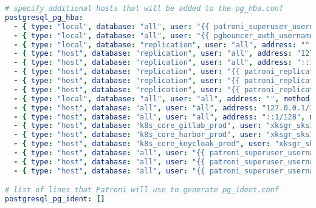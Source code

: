 \begin{flushleft}
\begin{lstlisting}[language=yaml, caption=Testsystem - Deployment - main.yml,captionpos=b,label={lst:testsystem-deployment-main.yml},breaklines=true]
# specify additional hosts that will be added to the pg_hba.conf
postgresql_pg_hba:
  - { type: "local", database: "all", user: "{{ patroni_superuser_username }}", address: "", method: "trust" }
  - { type: "local", database: "all", user: "{{ pgbouncer_auth_username }}", address: "", method: "trust" } # required for pgbouncer auth_user
  - { type: "local", database: "replication", user: "all", address: "", method: "trust" }
  - { type: "host", database: "replication", user: "all", address: "127.0.0.1/32", method: "trust" }
  - { type: "host", database: "replication", user: "all", address: "::1/128", method: "trust" }
  - { type: "host", database: "replication", user: "{{ patroni_replication_username }}", address: "10.0.22.173/24", method: "{{ postgresql_password_encryption_algorithm }}" }
  - { type: "host", database: "replication", user: "{{ patroni_replication_username }}", address: "10.0.22.174/24", method: "{{ postgresql_password_encryption_algorithm }}" }
  - { type: "host", database: "replication", user: "{{ patroni_replication_username }}", address: "10.0.22.175/24", method: "{{ postgresql_password_encryption_algorithm }}" }
  - { type: "local", database: "all", user: "all", address: "", method: "{{ postgresql_password_encryption_algorithm }}" }
  - { type: "host", database: "all", user: "all", address: "127.0.0.1/32", method: "{{ postgresql_password_encryption_algorithm }}" }
  - { type: "host", database: "all", user: "all", address: "::1/128", method: "{{ postgresql_password_encryption_algorithm }}" }
  - { type: "host", database: "k8s_core_gitlab_prod", user: "xksgr_sks1160_gitlab", address: "10.0.20.88/24", method: "{{ postgresql_password_encryption_algorithm }}" }
  - { type: "host", database: "k8s_core_harbor_prod", user: "xksgr_sks1172_harbor", address: "10.0.20.92/24", method: "{{ postgresql_password_encryption_algorithm }}" }
  - { type: "host", database: "k8s_core_keycloak_prod", user: "xksgr_sks1195_kcsso", address: "10.0.20.98/24", method: "{{ postgresql_password_encryption_algorithm }}" }
  - { type: "host", database: "all", user: "{{ patroni_superuser_username }}", address: "10.0.20.63/24", method: "{{ postgresql_password_encryption_algorithm }}" }
  - { type: "host", database: "all", user: "{{ patroni_superuser_username }}", address: "10.0.20.43/24", method: "{{ postgresql_password_encryption_algorithm }}" }
  - { type: "host", database: "all", user: "{{ patroni_superuser_username }}", address: "10.0.20.77/24", method: "{{ postgresql_password_encryption_algorithm }}" }

# list of lines that Patroni will use to generate pg_ident.conf
postgresql_pg_ident: []


\end{lstlisting}
\end{flushleft}
